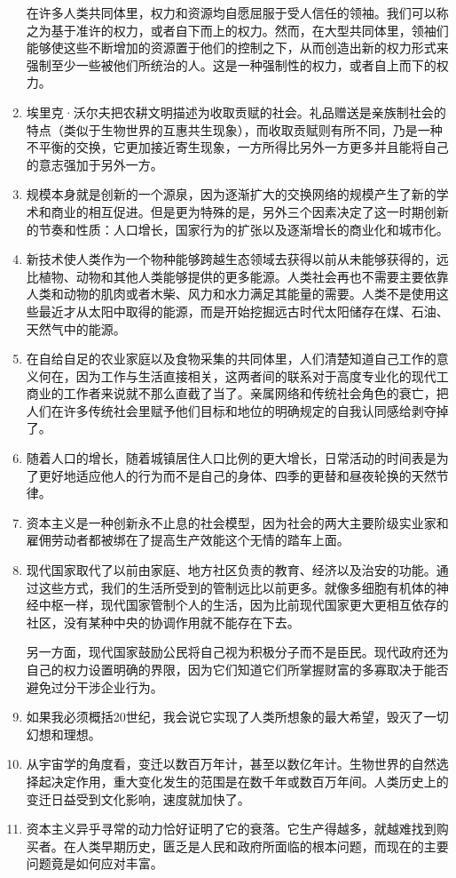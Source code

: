 \documentclass[UTF8]{ctexart}
\begin{document}
\begin{enumerate}
			在许多人类共同体里，权力和资源均自愿屈服于受人信任的领袖。我们可以称之为基于准许的权力，或者自下而上的权力。然而，在大型共同体里，领袖们能够使这些不断增加的资源置于他们的控制之下，从而创造出新的权力形式来强制至少一些被他们所统治的人。这是一种强制性的权力，或者自上而下的权力。
			\item 埃里克·沃尔夫把农耕文明描述为收取贡赋的社会。礼品赠送是亲族制社会的特点（类似于生物世界的互惠共生现象），而收取贡赋则有所不同，乃是一种不平衡的交换，它更加接近寄生现象，一方所得比另外一方更多并且能将自己的意志强加于另外一方。
			\item 规模本身就是创新的一个源泉，因为逐渐扩大的交换网络的规模产生了新的学术和商业的相互促进。但是更为特殊的是，另外三个因素决定了这一时期创新的节奏和性质：人口增长，国家行为的扩张以及逐渐增长的商业化和城市化。
			\item 新技术使人类作为一个物种能够跨越生态领域去获得以前从未能够获得的，远比植物、动物和其他人类能够提供的更多能源。人类社会再也不需要主要依靠人类和动物的肌肉或者木柴、风力和水力满足其能量的需要。人类不是使用这些最近才从太阳中取得的能源，而是开始挖掘远古时代太阳储存在煤、石油、天然气中的能源。
			\item 在自给自足的农业家庭以及食物采集的共同体里，人们清楚知道自己工作的意义何在，因为工作与生活直接相关，这两者间的联系对于高度专业化的现代工商业的工作者来说就不那么直截了当了。亲属网络和传统社会角色的衰亡，把人们在许多传统社会里赋予他们目标和地位的明确规定的自我认同感给剥夺掉了。
			\item 随着人口的增长，随着城镇居住人口比例的更大增长，日常活动的时间表是为了更好地适应他人的行为而不是自己的身体、四季的更替和昼夜轮换的天然节律。
			\item 资本主义是一种创新永不止息的社会模型，因为社会的两大主要阶级实业家和雇佣劳动者都被绑在了提高生产效能这个无情的踏车上面。
			\item 现代国家取代了以前由家庭、地方社区负责的教育、经济以及治安的功能。通过这些方式，我们的生活所受到的管制远比以前更多。就像多细胞有机体的神经中枢一样，现代国家管制个人的生活，因为比前现代国家更大更相互依存的社区，没有某种中央的协调作用就不能存在下去。
			
			另一方面，现代国家鼓励公民将自己视为积极分子而不是臣民。现代政府还为自己的权力设置明确的界限，因为它们知道它们所掌握财富的多寡取决于能否避免过分干涉企业行为。
			\item 如果我必须概括20世纪，我会说它实现了人类所想象的最大希望，毁灭了一切幻想和理想。
			\item 从宇宙学的角度看，变迁以数百万年计，甚至以数亿年计。生物世界的自然选择起决定作用，重大变化发生的范围是在数千年或数百万年间。人类历史上的变迁日益受到文化影响，速度就加快了。
			\item 资本主义异乎寻常的动力恰好证明了它的衰落。它生产得越多，就越难找到购买者。在人类早期历史，匮乏是人民和政府所面临的根本问题，而现在的主要问题竟是如何应对丰富。
			

\end{enumerate}
\end{document}
